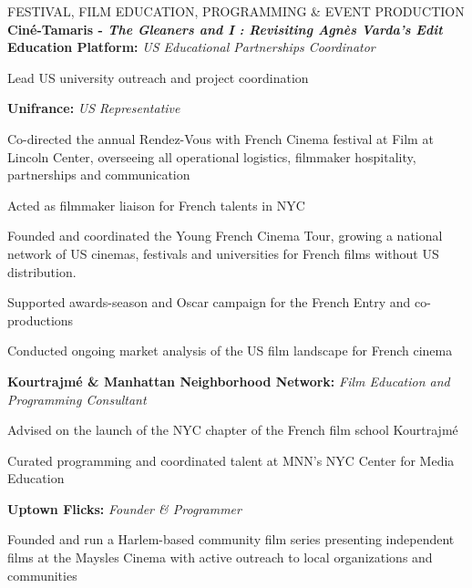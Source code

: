 \begin{rubric}{FESTIVAL, FILM EDUCATION, PROGRAMMING \& EVENT PRODUCTION}
  \entry*[2024-present]%
  \textbf{Cin\'e-Tamaris - \textit{The Gleaners and I : Revisiting Agn\`es Varda's Edit} Education Platform:} \textit{US Educational Partnerships Coordinator}
  \par
  \begin{cvitems}
    \item Lead US university outreach and project coordination
  \end{cvitems}

  \entry*[2013-2024]%
  \textbf{Unifrance:} \textit{US Representative}
  \par
  \begin{cvitems}
    \item Co-directed the annual Rendez-Vous with French Cinema festival at Film at Lincoln
      Center, overseeing all operational logistics, filmmaker hospitality, partnerships and
      communication
    \item Acted as filmmaker liaison for French talents in NYC
    \item Founded and coordinated the Young French Cinema Tour, growing a national network
      of US cinemas, festivals and universities for French films without US distribution.
    \item Supported awards-season and Oscar campaign for the French Entry and co-productions
    \item Conducted ongoing market analysis of the US film landscape for French cinema
  \end{cvitems}

  \entry*[2023-2024]%
  \textbf{Kourtrajm\'e \& Manhattan Neighborhood Network:} \textit{Film Education and Programming Consultant}
  \par
  \begin{cvitems}
    \item Advised on the launch of the NYC chapter of the French film school Kourtrajm\'e
    \item Curated programming and coordinated talent at MNN's NYC Center for Media Education
  \end{cvitems}

  \entry*[2016-present]%
  \textbf{Uptown Flicks:} \textit{Founder \& Programmer}
  \par
  \begin{cvitems}
    \item Founded and run a Harlem-based community film series presenting independent films at
      the Maysles Cinema with active outreach to local organizations and communities
  \end{cvitems}

\end{rubric}
